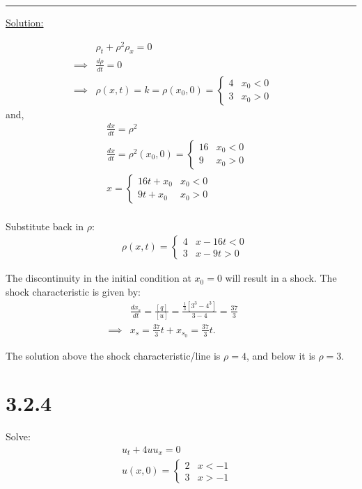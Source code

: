 \documentclass{article}
\begin{document}
\begin{center}
  \noindent\rule{8cm}{0.4pt}
\end{center}

\underline{Solution:}

\begin{align*}
  &\rho_t + \rho^2 \rho_x = 0 &&\\
  \implies& \frac{d\rho}{dt} = 0 &&\\
  \implies& \rho(x,t) = k = \rho(x_0, 0) = \begin{cases}
    4 & x_0 < 0 \\
    3 & x_0 > 0
  \end{cases}
\end{align*}
and,
\begin{align*}
  &\frac{dx}{dt} = \rho^2 &&\\
  &\frac{dx}{dt} = \rho^2(x_0, 0) = \begin{cases}
    16 & x_0 < 0 \\
    9 & x_0 > 0
  \end{cases} &&\\
  &x = \begin{cases}
    16t + x_0 & x_0 < 0 \\
    9t + x_0 & x_0 > 0
  \end{cases} &&\\
\end{align*}

Substitute back in $\rho$:
\begin{align*}
  &\rho(x,t) = \begin{cases}
    4 & x-16t < 0 \\
    3 & x-9t > 0
  \end{cases}
\end{align*}

The discontinuity in the initial condition at $x_0 = 0$ will result in a shock. The shock characteristic is given by:
\begin{align*}
  &\frac{dx_s}{dt} = \frac{[q]}{[u]} = \frac{\frac{1}{3} [3^3 - 4^3]}{3-4} = \frac{37}{3} &&\\
  \implies& x_s = \frac{37}{3}t + x_{s_0} = \frac{37}{3}t.
\end{align*}

The solution above the shock characteristic/line is $\rho=4$, and below it is $\rho=3$.

\newpage

\section*{3.2.4}
Solve:
\begin{align*}
  &u_t + 4u u_x = 0 &&\\
  &u(x,0) = \begin{cases}
    2 & x < -1 \\
    3 & x > -1
  \end{cases}
\end{align*}
\end{document}
